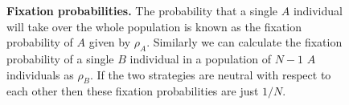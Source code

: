 \documentclass[oneside,11pt,a4paper]{book}
\begin{document}
\begin{figure}[h]
  \begin{center}
  \end{center}
  \caption{
  \label{fig:fixprob}
  \textbf{Fixation probabilities.}
\small{The probability that a single $A$ individual will take over the whole population is known as the fixation probability of $A$ given by $\rho_A$.
Similarly we can calculate the fixation probability of a single $B$ individual in a population of $N-1$ $A$ individuals as $\rho_B$.
If the two strategies are neutral with respect to each other then these fixation probabilities are just $1/N$.}
  }
\end{figure}
%
\end{document}
